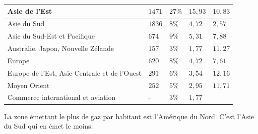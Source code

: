 \documentclass[12pt,a4paper]{book}
\begin{document}
\begin{enumMet}
\begin{tabular}{ | p{3cm} | p{} | p{} | p{} | p{} | }
		
		Asie de l'Est & 
		
		$1471$ & 
		
		$27\%$ & 
		
		$15,93$ & 
		
		$10,83$\\ \hline
		
		
		Asie du Sud & 
		
		$1836$ & 
		
		$8\%$ & 
		
		$4,72$ & 
		
		$2,57$\\ \hline
		
		
		Asie du Sud-Est et Pacifique & 
		
		$674$ & 
		
		$9\%$ & 
		
		$5,31$ & 
		
		$7,88$\\ \hline
		
		
		Australie, Japon, Nouvelle Zélande & 
		
		$157$ & 
		
		$3\%$ & 
		
		$1,77$ & 
		
		$11,27$\\ \hline
		
		
		Europe & 
		
		$620$ & 
		
		$8\%$ & 
		
		$4,72$ & 
		
		$7,61$\\ \hline
		
		
		Europe de l'Est, Asie Centrale et de l'Ouest & 
		
		$291$ & 
		
		$6\%$ & 
		
		$3,54$ & 
		
		$12,16$\\ \hline
		
		
		Moyen Orient & 
		
		$252$ & 
		
		$5\%$ & 
		
		$2,95$ & 
		
		$11,71$\\ \hline
		
		
		Commerce international et aviation & 
		
		- & 
		
		$3\%$ & 
		
		$1,77$ & 
		
		\\ \hline
	\end{tabular}
	
	
	\item La zone émettant le plus de gaz par habitant est l'Amérique du Nord. C'est l'Asie du Sud qui en émet le moins.
	
	
\end{enumMet}
\end{document}

